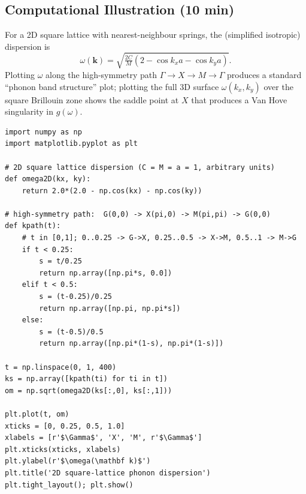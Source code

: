\documentclass[11pt,a4paper]{article}
\begin{document}
\subsection{Computational Illustration \hfill \small(10 min)}

For a 2D square lattice with nearest-neighbour springs, the (simplified isotropic)
dispersion is
\[
\omega(\mathbf k) = \sqrt{\tfrac{2C}{M}\left(2-\cos k_xa-\cos k_ya\right)}.
\]
Plotting $\omega$ along the high-symmetry path $\Gamma\to X\to M\to\Gamma$ produces a
standard ``phonon band structure'' plot; plotting the full 3D surface
$\omega(k_x,k_y)$ over the square Brillouin zone shows the saddle point at $X$ that
produces a Van Hove singularity in $g(\omega)$.

\begin{pybox}
\begin{lstlisting}
import numpy as np
import matplotlib.pyplot as plt

# 2D square lattice dispersion (C = M = a = 1, arbitrary units)
def omega2D(kx, ky):
    return 2.0*(2.0 - np.cos(kx) - np.cos(ky))

# high-symmetry path:  G(0,0) -> X(pi,0) -> M(pi,pi) -> G(0,0)
def kpath(t):
    # t in [0,1]; 0..0.25 -> G->X, 0.25..0.5 -> X->M, 0.5..1 -> M->G
    if t < 0.25:
        s = t/0.25
        return np.array([np.pi*s, 0.0])
    elif t < 0.5:
        s = (t-0.25)/0.25
        return np.array([np.pi, np.pi*s])
    else:
        s = (t-0.5)/0.5
        return np.array([np.pi*(1-s), np.pi*(1-s)])

t = np.linspace(0, 1, 400)
ks = np.array([kpath(ti) for ti in t])
om = np.sqrt(omega2D(ks[:,0], ks[:,1]))

plt.plot(t, om)
xticks = [0, 0.25, 0.5, 1.0]
xlabels = [r'$\Gamma$', 'X', 'M', r'$\Gamma$']
plt.xticks(xticks, xlabels)
plt.ylabel(r'$\omega(\mathbf k)$')
plt.title('2D square-lattice phonon dispersion')
plt.tight_layout(); plt.show()
\end{lstlisting}
\end{pybox}
\end{document}
